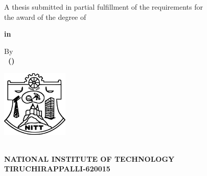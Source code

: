 \begin{titlepage}
\begin{center}
\fontsize{18pt}{1cm}\selectfont \textbf{\MakeUppercase\thetitle}

\vspace*{1.3cm}
\fontsize{14pt}{21pt}\selectfont A thesis submitted in partial fulfillment of the requirements for\\
the award of the degree of

\vspace*{0.4cm}
\fontsize{14pt}{1cm}\selectfont\textbf{\thedegree} 

\vspace*{0.4cm}
\textbf{in\\ \thedepartment}

\vspace*{2.0cm}
By\\
\textbf{\theauthor\ (\therollno)}

\vspace*{3.2cm}
\includegraphics[width=1.25in]{NITT-Logo}


\fontsize{16pt}{16pt}\selectfont \textbf{\MakeUppercase\thedepartment\\NATIONAL INSTITUTE OF TECHNOLOGY\\TIRUCHIRAPPALLI-620015}

\vspace{0.31cm}
\textbf{\MakeUppercase\themonth\ \theyear}
\end{center}
\end{titlepage}
